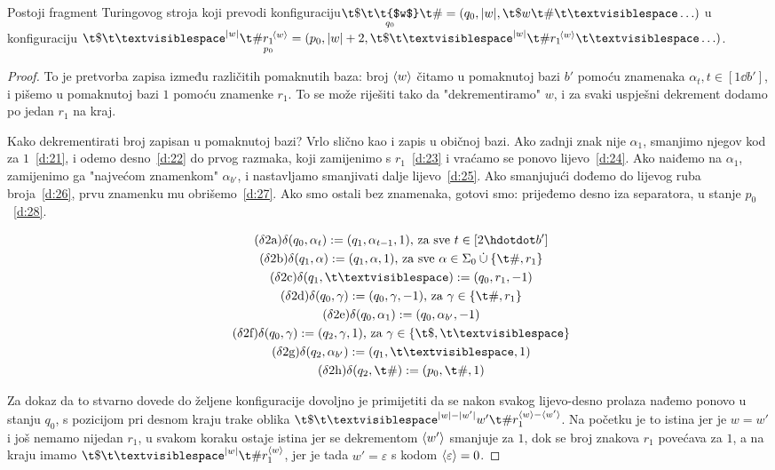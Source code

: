 \begin{lema}[{name=[drugi fragment transpiliranog stroja]}]\label{lm:faza2}
Postoji fragment Turingovog stroja koji prevodi konfiguraciju\newline $\T{\$}{q_0}{\t{$w$}}{\#}=(q_0,\dulj w,\t\$w\t\#\bl\ldots)$ u konfiguraciju $\t\$\bl^{\dulj w}\t\#\underset{\mathclap{p_0}}{r_1}^{\!\kr w}=(p_0,\dulj w+2,\t\$\bl^{\dulj w}\t\#r_1{}^{\!\kr w}\bl\ldots)$.
\end{lema}
\begin{proof}
To je pretvorba zapisa između različitih pomaknutih baza: broj $\langle w\rangle$ čitamo u pomaknutoj bazi $b'$ pomoću znamenaka $\alpha_t,t\in[1\dd b']$, i pišemo u pomaknutoj bazi $1$ pomoću znamenke $r_1$. To se može riješiti tako da "dekrementiramo" $w$, i za svaki uspješni dekrement dodamo po jedan $r_1$ na kraj.

Kako dekrementirati broj zapisan u pomaknutoj bazi? Vrlo slično kao i zapis u običnoj bazi. Ako zadnji znak nije $\alpha_1$, smanjimo njegov kod za $1$~\eqref{d:21}, i odemo desno~\eqref{d:22} do prvog razmaka, koji zamijenimo s $r_1$~\eqref{d:23} i vraćamo se ponovo lijevo~\eqref{d:24}. Ako naiđemo na $\alpha_1$, zamijenimo ga "najvećom znamenkom" $\alpha_{b'}$, i nastavljamo smanjivati dalje lijevo~\eqref{d:25}. Ako smanjujući dođemo do lijevog ruba broja~\eqref{d:26}, prvu znamenku mu obrišemo~\eqref{d:27}. Ako smo ostali bez znamenaka, gotovi smo: prijeđemo desno iza separatora, u stanje $p_0$~\eqref{d:28}.

\noindent\begin{gather*}
    \label{d:21}\tag{$\delta$2a}\delta(q_0,\alpha_t):=(q_1,\alpha_{t-1},1)\text{, za sve }t\in[2\dd b']\\
\label{d:22}\tag{$\delta$2b}\delta(q_1,\alpha):=(q_1,\alpha,1)\text{, za sve }\alpha\in\Sigma_0\mathbin{\dot\cup}\{\t\#,r_1\}\\
\label{d:23}\tag{$\delta$2c}\delta(q_1,\bl):=(q_0,r_1,-1)\\
\label{d:24}\tag{$\delta$2d}\delta(q_0,\gamma):=(q_0,\gamma,-1)\text{, za }\gamma\in\{\t\#,r_1\}\\
    \label{d:25}\tag{$\delta$2e}\delta(q_0,\alpha_1):=(q_0,\alpha_{b'},-1)\\
\label{d:26}\tag{$\delta$2f}\delta(q_0,\gamma):=(q_2,\gamma,1)\text{, za }\gamma\in\{\t\$,\bl\}\\
\label{d:27}\tag{$\delta$2g}\delta(q_2,\alpha_{b'}):=(q_1,\bl,1)\\
\label{d:28}\tag{$\delta$2h}\delta(q_2,\t\#):=(p_0,\t\#,1)
\end{gather*}

Za dokaz da to stvarno dovede do željene konfiguracije dovoljno je primijetiti da se nakon svakog lijevo-desno prolaza nađemo ponovo u stanju $q_0$, s pozicijom pri desnom kraju trake oblika $\t\$\bl^{\dulj w-\dulj{w'}}w'\t\#r_1^{\kr w-\kr{w'}}$. Na početku je to istina jer je $w=w'$ i još nemamo nijedan $r_1$, u svakom koraku ostaje istina jer se dekrementom $\langle w'\rangle$ smanjuje za $1$, dok se broj znakova $r_1$ povećava za $1$, a na kraju imamo $\t\$\bl^{\dulj w}\t\#r_1^{\kr w}$, jer je tada $w'=\varepsilon$ s kodom $\langle\varepsilon\rangle=0$.
\end{proof}

